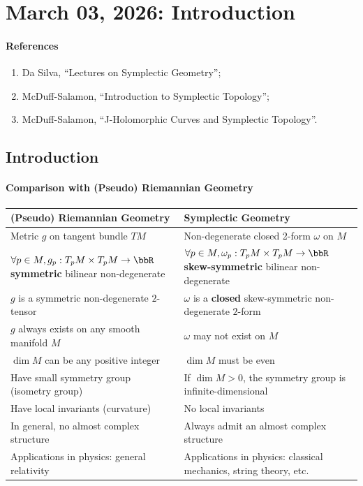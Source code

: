 \section{March 03, 2026: Introduction}

\paragraph{References}
\begin{enumerate}[label=(\arabic*)]
    \item Da Silva, ``Lectures on Symplectic Geometry'';
    \item McDuff-Salamon, ``Introduction to Symplectic Topology'';
    \item McDuff-Salamon, ``J-Holomorphic Curves and Symplectic Topology''.
\end{enumerate}

\subsection{Introduction}

    \paragraph{Comparison with (Pseudo) Riemannian Geometry}
        \begin{center}
            \begin{tabular}{p{}|p{}}
                \textbf{(Pseudo) Riemannian Geometry} & \textbf{Symplectic Geometry} \\
                \hline
                Metric \(g\) on tangent bundle \(TM\) & Non-degenerate closed 2-form \(\omega\) on \(M\) \\[1em]
                \(\forall p \in M, g_p: T_pM \times T_pM \to \bbR\) \textbf{symmetric} bilinear non-degenerate & \(\forall p \in M, \omega_p: T_pM \times T_pM \to \bbR\) \textbf{skew-symmetric} bilinear non-degenerate \\[1.5em]
                \(g\) is a symmetric non-degenerate \(2\)-tensor & \(\omega\) is a \textbf{closed} skew-symmetric non-degenerate \(2\)-form \\[1em]
                \(g\) always exists on any smooth manifold \(M\) & \(\omega\) may not exist on \(M\) \\[1em]
                \(\dim M\) can be any positive integer & \(\dim M\) must be even    \\[1em]
                Have small symmetry group (isometry group) & If \(\dim M > 0\), the symmetry group is infinite-dimensional \\[1em]
                Have local invariants (curvature) & No local invariants \\[1em]
                In general, no almost complex structure & Always admit an almost complex structure \\[1em]
                Applications in physics: general relativity & Applications in physics: classical mechanics, string theory, etc.
            \end{tabular}
        \end{center}

